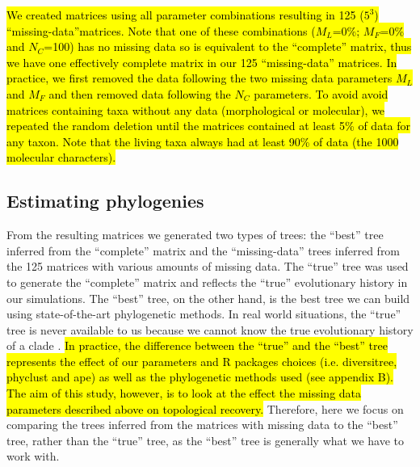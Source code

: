 \documentclass[12pt,letterpaper]{article}
\begin{document}
\hl{We created matrices using all parameter combinations resulting in 125 ($5^3$) ``missing-data''matrices.
Note that one of these combinations ($M_{L}$=0\%; $M_{F}$=0\% and $N_{C}$=100) has no missing data so is equivalent to the ``complete'' matrix, thus we have one effectively complete matrix in our 125 ``missing-data'' matrices.
In practice, we first removed the data following the two missing data parameters $M_L$ and $M_F$ and then removed data following the $N_C$ parameters.
To avoid avoid matrices containing taxa without any data (morphological or molecular), we repeated the random deletion until the matrices contained at least 5\% of data for any taxon.
Note that the living taxa always had at least 90\% of data (the 1000 molecular characters).}



\subsection{Estimating phylogenies}
From the resulting matrices we generated two types of trees: the ``best'' tree inferred from the ``complete'' matrix and the ``missing-data'' trees inferred from the 125 matrices with various amounts of missing data.
The ``true'' tree was used to generate the ``complete'' matrix and reflects the ``true'' evolutionary history in our simulations.
The ``best'' tree, on the other hand, is the best tree we can build using state-of-the-art phylogenetic methods.
In real world situations, the ``true'' tree is never available to us because we cannot know the true evolutionary history of a clade \citep[except in very rare circumstances, e.g.][]{rozen2005}.
\hl{In practice, the difference between the ``true'' and the ``best'' tree represents the effect of our parameters and R packages choices (i.e. diversitree, phyclust and ape) as well as the phylogenetic methods used (see appendix B).}
\hl{The aim of this study, however, is to look at the effect the missing data parameters described above on topological recovery.}
Therefore, here we focus on comparing the trees inferred from the matrices with missing data to the ``best'' tree, rather than the ``true'' tree, as the ``best'' tree is generally what we have to work with.
\end{document}
